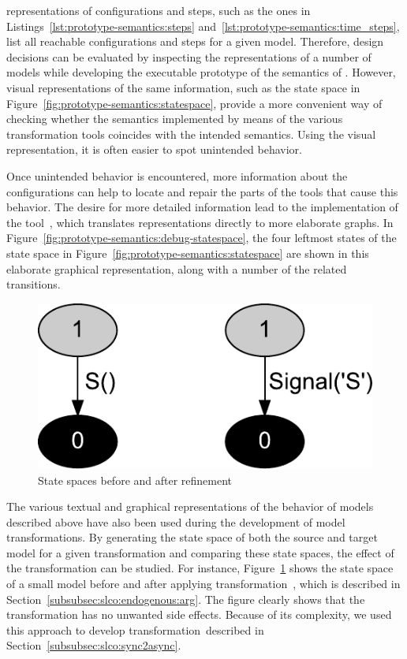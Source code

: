 \CS representations of configurations and steps, such as the ones in Listings~\ref{lst:prototype-semantics:steps} and~\ref{lst:prototype-semantics:time_steps}, list all reachable configurations and steps for a given \SLCO model.
Therefore, design decisions can be evaluated by inspecting the \CS representations of a number of models while developing the executable prototype of the semantics of \SLCO.
However, visual representations of the same information, such as the state space in Figure~\ref{fig:prototype-semantics:statespace}, provide a more convenient way of checking whether the semantics implemented by means of the various transformation tools coincides with the intended semantics.
Using the visual representation, it is often easier to spot unintended behavior.

Once unintended behavior is encountered, more information about the configurations can help to locate and repair the parts of the tools that cause this behavior.
The desire for more detailed information lead to the implementation of the tool~\CStoDot, which translates \CS representations directly to more elaborate \DOT graphs.
In Figure~\ref{fig:prototype-semantics:debug-statespace}, the four leftmost states of the state space in Figure~\ref{fig:prototype-semantics:statespace} are shown in this elaborate graphical representation, along with a number of the related transitions.

\begin{figure}[hbt]
  \centering
  \includegraphics[scale=.36]{prototype-semantics/figs/transformation-comparison}
  \caption{State spaces before and after refinement}
  \label{fig:prototype-semantics:compare-statespace}
\end{figure}

The various textual and graphical representations of the behavior of \SLCO models described above have also been used during the development of model transformations.
By generating the state space of both the source and target model for a given transformation and comparing these state spaces, the effect of the transformation can be studied.
For instance, Figure~\ref{fig:prototype-semantics:compare-statespace} shows the state space of a small \SLCO model before and after applying transformation~, which is described in Section~\ref{subsubsec:slco:endogenous:arg}.
The figure clearly shows that the transformation has no unwanted side effects.
Because of its complexity, we used this approach to develop transformation~\TGen described in Section~\ref{subsubsec:slco:sync2async}.